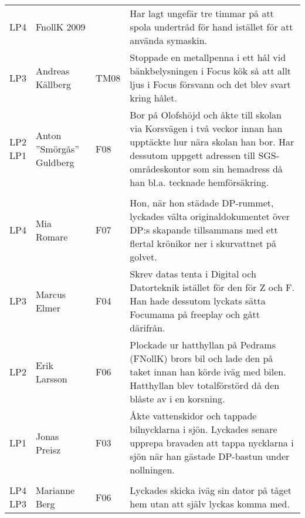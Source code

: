 \documentclass[a4paper]{article}
\begin{document}
\begin{longtable}{p{5mm}>{\raggedright\arraybackslash}p{30mm}p{10mm}p{108mm}}
\rowcolor{veryLightGray} \multicolumn{4}{l}{\textbf{2008/2009}} \\ \hline

LP4 & FnollK 2009 &  & Har lagt ungefär tre timmar på att spola undertråd för hand istället för att använda symaskin.\\ \hline

LP3 & Andreas Källberg & TM08 & Stoppade en metallpenna i ett hål vid bänkbelysningen i Focus kök så att allt ljus i Focus försvann och det blev svart kring hålet.\\ \hline

\makecell{LP2 \\ LP1} & Anton ''Smörgås'' Guldberg & F08 & Bor på Olofshöjd och åkte till skolan via Korsvägen i två veckor innan han upptäckte hur nära skolan han bor. Har dessutom uppgett adressen till SGS-områdeskontor som sin hemadress då han bl.a. tecknade hemförsäkring. \\ \hline

\rowcolor{veryLightGray} \multicolumn{4}{l}{\textbf{2007/2008}} \\ \hline

LP4 & Mia Romare & F07 & Hon, när hon städade DP-rummet, lyckades välta originaldokumentet över DP:s skapande tillsammans med ett flertal krönikor ner i skurvattnet på golvet.\\ \hline

LP3 & Marcus Elmer & F04 & Skrev datas tenta i Digital och Datorteknik istället för den för Z och F. Han hade dessutom lyckats sätta Focumama på freeplay och gått därifrån.\\ \hline

LP2 & Erik Larsson & F06 & Plockade ur hatthyllan på Pedrams (FNollK) brors bil och lade den på taket innan han körde iväg med bilen. Hatthyllan blev totalförstörd då den blåste av i en korsning.\\ \hline

LP1 & Jonas Preisz & F03 & Åkte vattenskidor och tappade bilnycklarna i sjön. Lyckades senare upprepa bravaden att tappa nycklarna i sjön när han gästade DP-bastun under nollningen.\\ \hline

\rowcolor{veryLightGray} \multicolumn{4}{l}{\textbf{2006/2007}} \\ \hline

\makecell{LP4 \\ LP3} & Marianne Berg & F06 & Lyckades skicka iväg sin dator på tåget hem utan att själv lyckas komma med.\\ \hline


\end{longtable}
\end{document}
